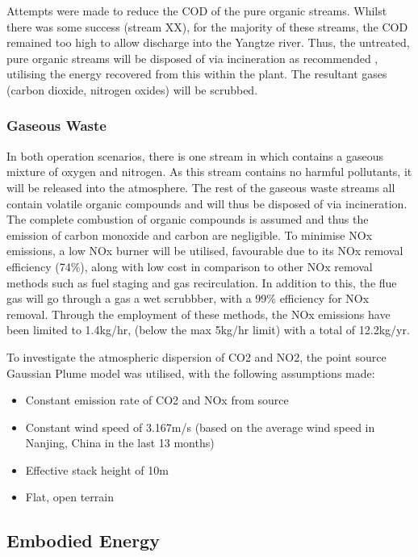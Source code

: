 

Attempts were made to reduce the COD of the pure organic streams. Whilst there was some success (stream XX), for the majority of these streams, the COD remained too high to allow discharge into the Yangtze river. Thus, the untreated, pure organic streams will be disposed of via incineration as recommended \cite{sinnott_coulson_2005}, utilising the energy recovered from this within the plant. The resultant gases (carbon dioxide, nitrogen oxides) will be scrubbed. 




\subsubsection{Gaseous Waste}

In both operation scenarios, there is one stream in which contains a gaseous mixture of oxygen and nitrogen. As this stream contains no harmful pollutants, it will be released into the atmosphere. The rest of the gaseous waste streams all contain volatile organic compounds and will thus be disposed of via incineration. The complete combustion of organic compounds is assumed and thus the emission of carbon monoxide and carbon are negligible. To minimise NOx emissions, a low NOx burner will be utilised, favourable due to its NOx removal efficiency (74\%), along with low cost in comparison to other NOx removal methods such as fuel staging and gas recirculation. In addition to this, the flue gas will go through a gas a wet scrubbber, with a 99\% efficiency for NOx removal. Through the employment of these methods, the NOx emissions have been limited to 1.4kg/hr, (below the max 5kg/hr limit) with a total of 12.2kg/yr. 

To investigate the atmospheric dispersion of CO2 and NO2, the point source Gaussian Plume model was utilised, with the following assumptions made:

\begin{itemize}
\item Constant emission rate of CO2 and NOx from source
\item Constant wind speed of 3.167m/s (based on the average wind speed in Nanjing, China in the last 13 months)
\item  Effective stack height of 10m 
\item  Flat, open terrain
\end{itemize}









\subsection{Embodied Energy}